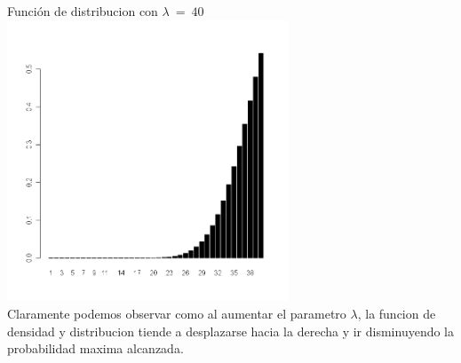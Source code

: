 \begin{itemize}
	Funci\'on de distribucion con $\lambda\ =\ 40$\\
  	  \includegraphics[width=3.3in,height=3.3in]{images/1_4-ppois40.png}\\

	Claramente podemos observar como al aumentar el parametro $\lambda$, la funcion de densidad y distribucion tiende a desplazarse hacia la derecha y ir disminuyendo la probabilidad maxima alcanzada.

\end{itemize}
